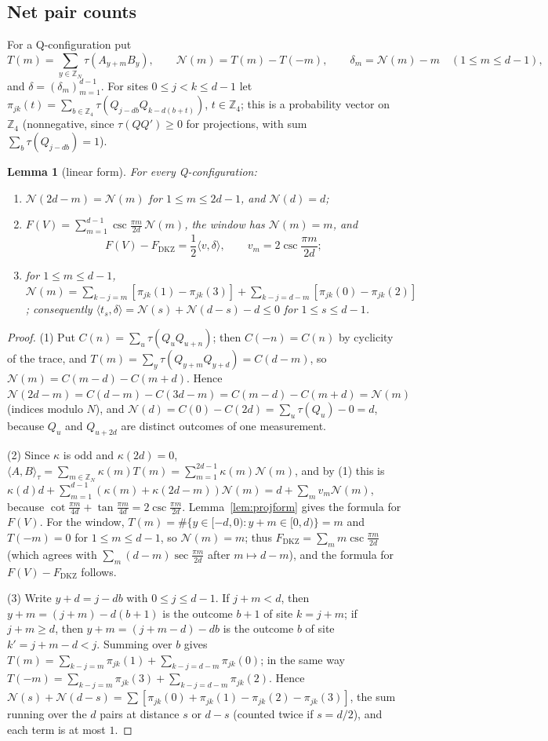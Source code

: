 \documentclass[11pt]{amsart}
\newtheorem{lemma}[theorem]{Lemma}
\theoremstyle{definition}
\theoremstyle{remark}
\numberwithin{equation}{section}
\newcommand{\Z}{\mathbb{Z}}
\newcommand{\FD}{F_{\mathrm{DKZ}}}
\newcommand{\ip}[2]{\langle #1,#2\rangle}
\newcommand{\cN}{\mathcal{N}}
\begin{document}
\subsection{Net pair counts}
For a Q-configuration put
\[
T(m)=\sum_{y\in\Z_N}\tau(A_{y+m}B_y),\qquad \cN(m)=T(m)-T(-m),\qquad \delta_m=\cN(m)-m\quad(1\le m\le d-1),
\]
and $\delta=(\delta_m)_{m=1}^{d-1}$. For sites $0\le j<k\le d-1$ let
$\pi_{jk}(t)=\sum_{b\in\Z_4}\tau(Q_{j-db}Q_{k-d(b+t)})$, $t\in\Z_4$; this is a probability vector on $\Z_4$
(nonnegative, since $\tau(QQ')\ge0$ for projections, with sum $\sum_b\tau(Q_{j-db})=1$).

\begin{lemma}[linear form]\label{lem:linearform}
For every Q-configuration:
\begin{enumerate}
\item $\cN(2d-m)=\cN(m)$ for $1\le m\le 2d-1$, and $\cN(d)=d$;
\item $F(V)=\sum_{m=1}^{d-1}\csc\frac{\pi m}{2d}\,\cN(m)$, the window has $\cN(m)=m$, and
\[
F(V)-\FD=\frac12\ip v\delta,\qquad v_m=2\csc\frac{\pi m}{2d};
\]
\item for $1\le m\le d-1$,
$\cN(m)=\sum_{k-j=m}[\pi_{jk}(1)-\pi_{jk}(3)]+\sum_{k-j=d-m}[\pi_{jk}(0)-\pi_{jk}(2)]$; consequently
$\ip{t_s}\delta=\cN(s)+\cN(d-s)-d\le0$ for $1\le s\le d-1$.
\end{enumerate}
\end{lemma}

\begin{proof}
(1) Put $C(n)=\sum_u\tau(Q_uQ_{u+n})$; then $C(-n)=C(n)$ by cyclicity of the trace, and
$T(m)=\sum_y\tau(Q_{y+m}Q_{y+d})=C(d-m)$, so $\cN(m)=C(m-d)-C(m+d)$. Hence
$\cN(2d-m)=C(d-m)-C(3d-m)=C(m-d)-C(m+d)=\cN(m)$ (indices modulo $N$), and
$\cN(d)=C(0)-C(2d)=\sum_u\tau(Q_u)-0=d$, because $Q_u$ and $Q_{u+2d}$ are distinct outcomes of one measurement.

(2) Since $\kappa$ is odd and $\kappa(2d)=0$, $\ip AB_\tau=\sum_{m\in\Z_N}\kappa(m)T(m)=\sum_{m=1}^{2d-1}\kappa(m)\cN(m)$,
and by (1) this is $\kappa(d)d+\sum_{m=1}^{d-1}(\kappa(m)+\kappa(2d-m))\cN(m)=d+\sum_mv_m\cN(m)$, because
$\cot\frac{\pi m}{4d}+\tan\frac{\pi m}{4d}=2\csc\frac{\pi m}{2d}$. Lemma~\ref{lem:projform} gives the formula for $F(V)$.
For the window, $T(m)=\#\{y\in[-d,0):y+m\in[0,d)\}=m$ and $T(-m)=0$ for $1\le m\le d-1$, so $\cN(m)=m$; thus
$\FD=\sum_mm\csc\frac{\pi m}{2d}$ (which agrees with $\sum_m(d-m)\sec\frac{\pi m}{2d}$ after $m\mapsto d-m$), and the
formula for $F(V)-\FD$ follows.

(3) Write $y+d=j-db$ with $0\le j\le d-1$. If $j+m<d$, then $y+m=(j+m)-d(b+1)$ is the outcome $b+1$ of site $k=j+m$; if
$j+m\ge d$, then $y+m=(j+m-d)-db$ is the outcome $b$ of site $k'=j+m-d<j$. Summing over $b$ gives
$T(m)=\sum_{k-j=m}\pi_{jk}(1)+\sum_{k-j=d-m}\pi_{jk}(0)$; in the same way
$T(-m)=\sum_{k-j=m}\pi_{jk}(3)+\sum_{k-j=d-m}\pi_{jk}(2)$. Hence
$\cN(s)+\cN(d-s)=\sum[\pi_{jk}(0)+\pi_{jk}(1)-\pi_{jk}(2)-\pi_{jk}(3)]$, the sum running over the $d$ pairs at distance
$s$ or $d-s$ (counted twice if $s=d/2$), and each term is at most $1$.
\end{proof}
\end{document}
